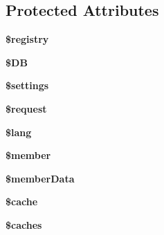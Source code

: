 \subsection*{Protected Attributes}
\begin{DoxyCompactItemize}
\item 
\hypertarget{classadmin_functions_a531e4a386aaa7f3e06d3642dc38d7e80}{{\bfseries \$registry}}\label{classadmin_functions_a531e4a386aaa7f3e06d3642dc38d7e80}

\item 
\hypertarget{classadmin_functions_a7dc56dc8b18ad37272b56fa7395bedef}{{\bfseries \$\-D\-B}}\label{classadmin_functions_a7dc56dc8b18ad37272b56fa7395bedef}

\item 
\hypertarget{classadmin_functions_ac7c3353107070daa85f641882931b358}{{\bfseries \$settings}}\label{classadmin_functions_ac7c3353107070daa85f641882931b358}

\item 
\hypertarget{classadmin_functions_abb35c8495a232b510389fa6d7b15d38a}{{\bfseries \$request}}\label{classadmin_functions_abb35c8495a232b510389fa6d7b15d38a}

\item 
\hypertarget{classadmin_functions_a7714b111b644017933931ec69a154102}{{\bfseries \$lang}}\label{classadmin_functions_a7714b111b644017933931ec69a154102}

\item 
\hypertarget{classadmin_functions_a5e1c849c6148a8732eee400fcee0d044}{{\bfseries \$member}}\label{classadmin_functions_a5e1c849c6148a8732eee400fcee0d044}

\item 
\hypertarget{classadmin_functions_ae9d848ba2cf6eee63bdc060e2dfcf95a}{{\bfseries \$member\-Data}}\label{classadmin_functions_ae9d848ba2cf6eee63bdc060e2dfcf95a}

\item 
\hypertarget{classadmin_functions_ac2dc76d756ec398393d4b1d23659276c}{{\bfseries \$cache}}\label{classadmin_functions_ac2dc76d756ec398393d4b1d23659276c}

\item 
\hypertarget{classadmin_functions_a0334a912b7c2d39a9bc71177578d782e}{{\bfseries \$caches}}\label{classadmin_functions_a0334a912b7c2d39a9bc71177578d782e}

\end{DoxyCompactItemize}



